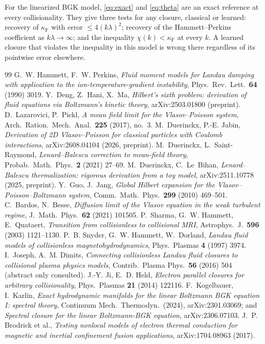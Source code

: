 \documentclass[11pt]{article}
\theoremstyle{remark}
\begin{document}
For the linearized BGK model, \eqref{eq:exact} and \eqref{eq:theta} are an
exact reference at every collisionality. They give three tests for any
closure, classical or learned: recovery of $\kappa_{\mathrm F}$ with error
$\le4(k\lambda)^2$; recovery of the Hammett--Perkins coefficient as
$k\lambda\to\infty$; and the inequality $\chi(k)<\kappa_{\mathrm F}$ at every
$k$. A learned closure that violates the inequality in this model is wrong
there regardless of its pointwise error elsewhere.

\begin{thebibliography}{99}
\small
{} G.~W. Hammett, F.~W. Perkins, \emph{Fluid moment models for
Landau damping with application to the ion-temperature-gradient
instability}, Phys.\ Rev.\ Lett.\ \textbf{64} (1990) 3019.
 Y.~Deng, Z.~Hani, X.~Ma, \emph{Hilbert's sixth problem:
derivation of fluid equations via Boltzmann's kinetic theory},
arXiv:2503.01800 (preprint).
 D.~Lazarovici, P.~Pickl, \emph{A mean field limit
for the Vlasov--Poisson system}, Arch.\ Ration.\ Mech.\ Anal.\ \textbf{225}
(2017), no.~3.
 M.~Duerinckx, P.-E. Jabin, \emph{Derivation of 2D
Vlasov--Poisson for classical particles with Coulomb interactions},
arXiv:2608.04104 (2026, preprint).
 M.~Duerinckx, L.~Saint-Raymond, \emph{Lenard--Balescu
correction to mean-field theory}, Probab.\ Math.\ Phys.\ \textbf{2} (2021)
27--69.
 M.~Duerinckx, C.~Le~Bihan, \emph{Lenard--Balescu
thermalization: rigorous derivation from a toy model}, arXiv:2511.10778
(2025, preprint).
 Y.~Guo, J.~Jang, \emph{Global Hilbert expansion for the
Vlasov--Poisson--Boltzmann system}, Comm.\ Math.\ Phys.\ \textbf{299} (2010)
469--501.
 C.~Bardos, N.~Besse, \emph{Diffusion limit of the
Vlasov equation in the weak turbulent regime}, J.\ Math.\ Phys.\ \textbf{62}
(2021) 101505.
 P.~Sharma, G.~W. Hammett, E.~Quataert, \emph{Transition from
collisionless to collisional MRI}, Astrophys.\ J.\ \textbf{596} (2003)
1121--1130.
 P.~B. Snyder, G.~W. Hammett, W.~Dorland, \emph{Landau fluid
models of collisionless magnetohydrodynamics}, Phys.\ Plasmas \textbf{4}
(1997) 3974.
 I.~Joseph, A.~M. Dimits, \emph{Connecting
collisionless Landau fluid closures to collisional plasma physics models},
Contrib.\ Plasma Phys.\ \textbf{56} (2016) 504 (abstract only consulted).
 J.-Y. Ji, E.~D. Held, \emph{Electron parallel closures for
arbitrary collisionality}, Phys.\ Plasmas \textbf{21} (2014) 122116.
 F.~Kogelbauer, I.~Karlin, \emph{Exact hydrodynamic manifolds for
the linear Boltzmann BGK equation I: spectral theory}, Continuum Mech.\
Thermodyn.\ (2024), arXiv:2301.03069; and \emph{Spectral closure for the
linear Boltzmann-BGK equation}, arXiv:2306.07103.
 J.~P. Brodrick et al., \emph{Testing nonlocal models of
electron thermal conduction for magnetic and inertial confinement fusion
applications}, arXiv:1704.08963 (2017).
\end{thebibliography}
\end{document}
